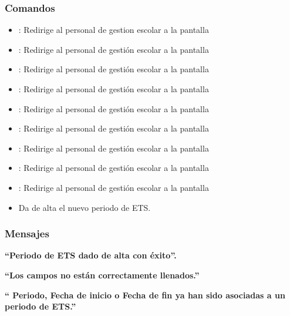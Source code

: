 \subsubsection{Comandos}
\begin{itemize}
	\item {}: Redirige al personal de gestion escolar a la pantalla 
	
	\item {}: Redirige al personal de gestión escolar a la pantalla 
	\item {}: Redirige al personal de gestión escolar a la pantalla 
	
	\item {}: Redirige al personal de gestión escolar a la pantalla 
	\item {}: Redirige al personal de gestión escolar a la pantalla 
	
	\item {}: Redirige al personal de gestión escolar a la pantalla 
	\item {}: Redirige al personal de gestión escolar a la pantalla 
	
	\item {}: Redirige al personal de gestión escolar a la pantalla 
	\item {}: Redirige al personal de gestión escolar a la pantalla 
	
    \item {} Da de alta el nuevo periodo de ETS.
    
\end{itemize}

\subsubsection{Mensajes}

\begin{Citemize}
    \item {\bf ``Periodo de ETS  dado de alta con éxito''.}
    \item {\bf ``Los campos no están correctamente llenados.''}
    \item {\bf `` Periodo, Fecha de inicio o Fecha de fin ya han sido asociadas a un periodo de ETS.''}
\end{Citemize}

